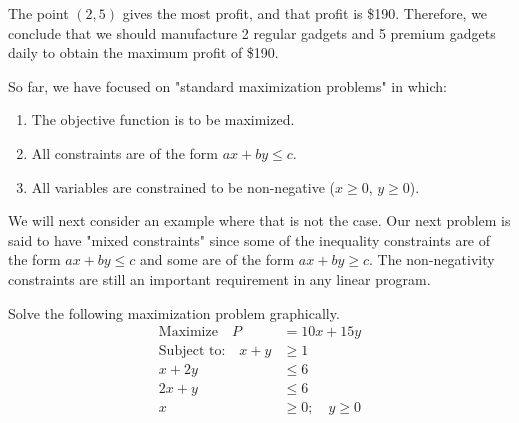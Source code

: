 The point $(2, 5)$ gives the most profit, and that profit is \$190. Therefore, we conclude that we should manufacture 2 regular gadgets and 5 premium gadgets daily to obtain the maximum profit of \$190.


So far, we have focused on "standard maximization problems" in which:
\begin{enumerate}
    \item The objective function is to be maximized.
    \item All constraints are of the form $ax + by \leq c$.
    \item All variables are constrained to be non-negative ($x \geq 0$, $y \geq 0$).
\end{enumerate}

We will next consider an example where that is not the case. Our next problem is said to have "mixed constraints" since some of the inequality constraints are of the form $ax + by \leq c$ and some are of the form $ax + by \geq c$. The non-negativity constraints are still an important requirement in any linear program.

\begin{example}
    Solve the following maximization problem graphically.
    \begin{align*}
        \text{Maximize} \quad P        & = 10x + 15y            \\
        \text{Subject to:} \quad x + y & \geq 1                 \\
        x + 2y                         & \leq 6                 \\
        2x + y                         & \leq 6                 \\
        x                              & \geq 0; \quad y \geq 0
    \end{align*}
\end{example}

